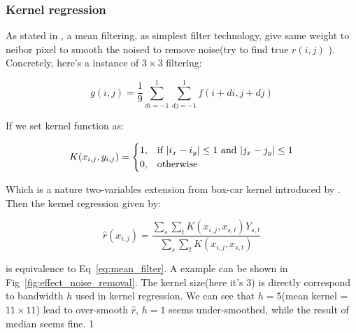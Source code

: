 \documentclass{beamer}
\begin{document}
\begin{frame}

    \frametitle{Kernel regression}

    As stated in \cite{solomon2011fundamentals}, a mean filtering, as simplest filter technology, give same weight to neibor pixel to smooth the
    noised to remove noise(try to find true $r(i,j)$ ). Concretely, here's a instance of $3 \times 3$ filtering:
    
    \begin{equation}
    g(i,j) = \frac{1}{9} \sum_{di=-1}^1 \sum_{dj=-1}^1 f(i+di,j+dj)
    \label{eq:mean_filter}
    \end{equation}
    
    If we set kernel function as:
    
    $$ 
    K(x_{i,j},y_{i,j}) =  
    \begin{cases}
      1, & \text{if $ |i_x - i_y| \le 1$ and $|j_x - j_y| \le 1$} \\
      0, & \text{otherwise}
    \end{cases}
    $$
    
    Which is a nature two-variables extension from box-car kernel introduced by \cite{wasserman2006all}.
    Then the kernel regression given by:
    
    $$
    \hat{r}(x_{i,j}) = \frac{\sum_{s} \sum_{t} K(x_{i,j},x_{s,t}) Y_{s,t}}{\sum_{s} \sum_{t} K(x_{i,j},x_{s,t})}
    $$
    
    is equivalence to Eq~\ref{eq:mean_filter}. A example can be shown in Fig~\ref{fig:effect_noise_removal}. 
    The kernel size(here it's $3$) is directly correspond to bandwidth $h$ used in kernel regression. 
    We can see that $h=5$(mean kernel = $11 \times 11 $) lead to over-smooth $\hat{r}$, $h=1$ seems under-smoothed,
    while the result of median seems fine.
    1
\end{frame}
\end{document}
